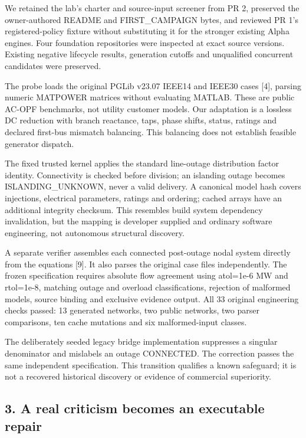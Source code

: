\documentclass[
  10pt,
]{article}
\begin{document}
We retained the lab's charter and source-input screener from PR 2,
preserved the owner-authored README and FIRST\_CAMPAIGN bytes, and
reviewed PR 1's registered-policy fixture without substituting it for
the stronger existing Alpha engines. Four foundation repositories were
inspected at exact source versions. Existing negative lifecycle results,
generation cutoffs and unqualified concurrent candidates were preserved.

The probe loads the original PGLib v23.07 IEEE14 and IEEE30 cases
{[}4{]}, parsing numeric MATPOWER matrices without evaluating MATLAB.
These are public AC-OPF benchmarks, not utility customer models. Our
adaptation is a lossless DC reduction with branch reactance, taps, phase
shifts, status, ratings and declared first-bus mismatch balancing. This
balancing does not establish feasible generator dispatch.

The fixed trusted kernel applies the standard line-outage distribution
factor identity. Connectivity is checked before division; an islanding
outage becomes ISLANDING\_UNKNOWN, never a valid delivery. A canonical
model hash covers injections, electrical parameters, ratings and
ordering; cached arrays have an additional integrity checksum. This
resembles build system dependency invalidation, but the mapping is
developer supplied and ordinary software engineering, not autonomous
structural discovery.

A separate verifier assembles each connected post-outage nodal system
directly from the equations {[}9{]}. It also parses the original case
files independently. The frozen specification requires absolute flow
agreement using atol=1e-6 MW and rtol=1e-8, matching outage and overload
classifications, rejection of malformed models, source binding and
exclusive evidence output. All 33 original engineering checks passed: 13
generated networks, two public networks, two parser comparisons, ten
cache mutations and six malformed-input classes.

The deliberately seeded legacy bridge implementation suppresses a
singular denominator and mislabels an outage CONNECTED. The correction
passes the same independent specification. This transition qualifies a
known safeguard; it is not a recovered historical discovery or evidence
of commercial superiority.

\hypertarget{a-real-criticism-becomes-an-executable-repair}{%
\subsection{3. A real criticism becomes an executable
repair}\label{a-real-criticism-becomes-an-executable-repair}}
\end{document}
